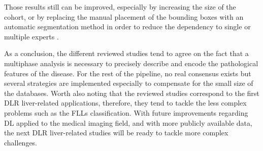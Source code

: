 \documentclass[]{article}
\begin{document}
Those results still can be improved, especially by increasing the size
of the cohort, or by replacing the manual placement of the bounding
boxes with an automatic segmentation method in order to reduce the
dependency to single or multiple experts \cite{Yasaka2018a,Peng2020}.

As a conclusion, the different reviewed studies tend to agree on the
fact that a multiphase analysis is necessary to precisely describe and
encode the pathological features of the disease. For the rest of the
pipeline, no real consensus exists but several strategies are
implemented especially to compensate for the small size of the
databases. Worth also noting that the reviewed studies correspond to the
first DLR liver-related applications, therefore, they tend to tackle the
less complex problems such as the FLLs classification. With future
improvements regarding DL applied to the medical imaging field, and with
more publicly available data, the next DLR liver-related studies will be
ready to tackle more complex challenges.

\newpage
	
	
\end{document}
